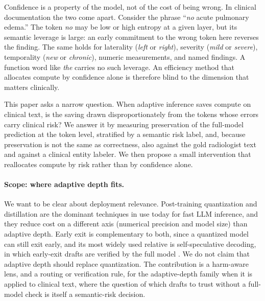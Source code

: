 \documentclass[11pt]{article}
\begin{document}
Confidence is a property of the model, not of the cost of being wrong. In clinical documentation the
two come apart. Consider the phrase ``\emph{no} acute pulmonary edema.'' The token \emph{no} may be
low or high entropy at a given layer, but its semantic leverage is large: an early commitment to the
wrong token here reverses the finding. The same holds for laterality (\emph{left} or \emph{right}),
severity (\emph{mild} or \emph{severe}), temporality (\emph{new} or \emph{chronic}), numeric
measurements, and named findings. A function word like \emph{the} carries no such leverage. An
efficiency method that allocates compute by confidence alone is therefore blind to the dimension that
matters clinically.

This paper asks a narrow question. When adaptive inference saves compute on clinical text, is the
saving drawn disproportionately from the tokens whose errors carry clinical risk? We answer it by
measuring preservation of the full-model prediction at the token level, stratified by a semantic
risk label, and, because preservation is not the same as correctness, also against the gold
radiologist text and against a clinical entity labeler. We then propose a small intervention that
reallocates compute by risk rather than by confidence alone.

\paragraph{Scope: where adaptive depth fits.}
We want to be clear about deployment relevance. Post-training quantization \cite{llmint8,gptq,awq} and
distillation are the dominant techniques in use today for fast LLM inference, and they reduce cost on a
different axis (numerical precision and model size) than adaptive depth. Early exit is complementary
to both, since a quantized model can still exit early, and its most widely used relative is
self-speculative decoding, in which early-exit drafts are verified by the full model \cite{layerskip}.
We do not claim that adaptive depth should replace quantization. The contribution is a harm-aware lens,
and a routing or verification rule, for the adaptive-depth family when it is applied to clinical text,
where the question of which drafts to trust without a full-model check is itself a semantic-risk
decision.
\end{document}
